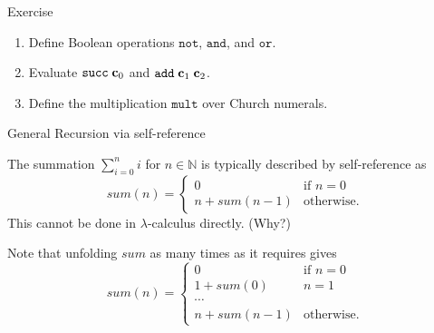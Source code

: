\begin{frame}{Exercise}
  \begin{enumerate}
    \item Define Boolean operations $\mathtt{not}$, $\mathtt{and}$, and $\mathtt{or}$.
    \item Evaluate $\mathtt{succ}\;\mathbf{c}_0$ and $\mathtt{add}\;\mathbf{c}_{1}\;\mathbf{c}_{2}$. 
    \item Define the multiplication $\mathtt{mult}$ over Church numerals.

  \end{enumerate}
\end{frame}
\begin{frame}{General Recursion via self-reference}

  The summation $\sum_{i = 0}^{n} i$ for $n \in \mathbb{N}$ is typically
  described by self-reference as
\[
  \mathit{sum}(n) =
    \begin{cases} 
     0 & \text{if } n = 0 \\
     n + \mathit{sum}(n - 1)  & \text{otherwise}.
    \end{cases}
\]
This \alert{cannot} be done in $\lambda$-calculus directly. (Why?)

Note that unfolding $\mathit{sum}$ as many times as it requires gives
\[
  \mathit{sum}(n) =
    \begin{cases} 
     0 & \text{if } n = 0 \\
     1 + \mathit{sum}(0) & n = 1 \\
     \cdots \\
     n + \mathit{sum}(n - 1)  & \text{otherwise}.
    \end{cases}
\]


\end{frame}

